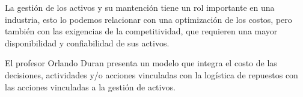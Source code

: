 \documentclass[]{article}
\begin{document}
La gestión de los activos y su mantención tiene un rol importante en una industria, esto lo podemos relacionar con una optimización de los costos, pero también con las exigencias de la competitividad, que requieren una mayor disponibilidad y confiabilidad de sus activos.


El profesor Orlando Duran presenta un modelo que integra el costo de las decisiones, actividades y/o acciones vinculadas con la logística de repuestos con las acciones vinculadas a la gestión de activos.



\begin{center}
    


\begin{tikzpicture}[x=0.75pt,y=0.75pt,yscale=-1,xscale=1]


\end{tikzpicture}
\end{center}
\end{document}
